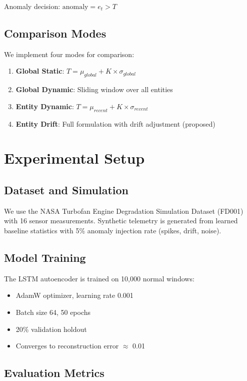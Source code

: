 \documentclass[conference]{IEEEtran}
\begin{document}
Anomaly decision: $\text{anomaly} = e_t > T$

\subsection{Comparison Modes}

We implement four modes for comparison:

\begin{enumerate}
\item \textbf{Global Static}: $T = \mu_{global} + K \times \sigma_{global}$
\item \textbf{Global Dynamic}: Sliding window over all entities
\item \textbf{Entity Dynamic}: $T = \mu_{recent} + K \times \sigma_{recent}$
\item \textbf{Entity Drift}: Full formulation with drift adjustment (proposed)
\end{enumerate}

\section{Experimental Setup}

\subsection{Dataset and Simulation}

We use the NASA Turbofan Engine Degradation Simulation Dataset (FD001) \cite{saxena2008} with 16 sensor measurements. Synthetic telemetry is generated from learned baseline statistics with 5\% anomaly injection rate (spikes, drift, noise).

\subsection{Model Training}

The LSTM autoencoder is trained on 10,000 normal windows:
\begin{itemize}
\item AdamW optimizer, learning rate 0.001
\item Batch size 64, 50 epochs
\item 20\% validation holdout
\item Converges to reconstruction error $\approx$ 0.01
\end{itemize}

\subsection{Evaluation Metrics}
\end{document}
